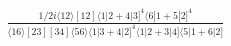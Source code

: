 \documentclass[varwidth, border=5pt]{standalone}
\begin{document}
\begin{my}
$\begin{gathered}
\scriptscriptstyle\frac{1/2i⟨12⟩[12]⟨1|2+4|3]^4⟨6|1+5|2]^4}{⟨16⟩[23][34]⟨56⟩⟨1|3+4|2]^4⟨1|2+3|4]⟨5|1+6|2]}
\end{gathered}$
\end{my}
\end{document}
